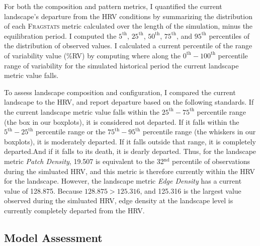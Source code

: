 For both the composition and pattern metrics, I quantified the current landscape's departure from the HRV conditions by summarizing the distribution of each \textsc{Fragstats} metric calculated over the length of the simulation, minus the equilibration period. I computed the $5^{\text{th}}$, $25^{\text{th}}$, $50^{\text{th}}$, $75^{\text{th}}$, and $95^{\text{th}}$ percentiles of the distribution of observed values. I calculated a current percentile of the range of variability value (\%RV) by computing where along the $0^{\text{th}}-100^{\text{th}}$ percentile range of variability for the simulated historical period the current landscape metric value falls. 

To assess landscape composition and configuration, I compared the current landscape to the HRV, and report departure based on the following standards. If the current landscape metric value falls within the $25^{\text{th}}-75^{\text{th}}$ percentile range (the box in our boxplots), it is considered not departed. If it falls within the $5^{\text{th}}-25^{\text{th}}$ percentile range or the $75^{\text{th}}-95^{\text{th}}$ percentile range (the whiskers in our boxplots), it is moderately departed. If it falls outside that range, it is completely departed.And if it falls to its death, it is dearly departed. Thus, for the landscape metric \emph{Patch Density}, 19.507 is equivalent to the 32$^{\text{nd}}$ percentile of observations during the simluated HRV, and this metric is therefore currently within the HRV for the landscape. However, the landscape metric \emph{Edge Density} has a current value of 128.875. Because $128.875 > 125.316$, and 125.316 is the largest value observed during the simluated HRV, edge density at the landscape level is currently completely departed from the HRV. 

\clearpage

\subsection{Model Assessment}
\label{subsec:modelassessment}

